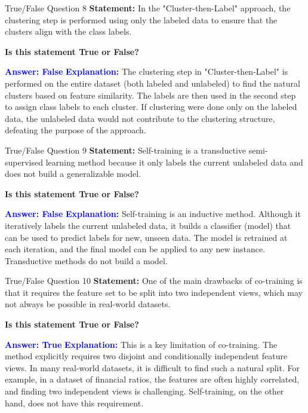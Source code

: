 \documentclass[8pt]{beamer}  %
\begin{document}
	\begin{frame}{True/False Question 8}
		\textbf{Statement:} In the "Cluster-then-Label" approach, the clustering step is performed using only the labeled data to ensure that the clusters align with the class labels.
		
		\vspace{0.3cm}
		\textbf{Is this statement True or False?}
		
		\vspace{0.2cm}
		\textcolor{blue}{\textbf{Answer: False}}
		\vspace{0.2cm}
		\textcolor{blue}{\textbf{Explanation:}} The clustering step in "Cluster-then-Label" is performed on the entire dataset (both labeled and unlabeled) to find the natural clusters based on feature similarity. The labels are then used in the second step to assign class labels to each cluster. If clustering were done only on the labeled data, the unlabeled data would not contribute to the clustering structure, defeating the purpose of the approach.
	\end{frame}
	
	\begin{frame}{True/False Question 9}
		\textbf{Statement:} Self-training is a transductive semi-supervised learning method because it only labels the current unlabeled data and does not build a generalizable model.
		
		\vspace{0.3cm}
		\textbf{Is this statement True or False?}
		
		\vspace{0.2cm}
		\textcolor{blue}{\textbf{Answer: False}}
		\vspace{0.2cm}
		\textcolor{blue}{\textbf{Explanation:}} Self-training is an inductive method. Although it iteratively labels the current unlabeled data, it builds a classifier (model) that can be used to predict labels for new, unseen data. The model is retrained at each iteration, and the final model can be applied to any new instance. Transductive methods do not build a model.
	\end{frame}
	
	\begin{frame}{True/False Question 10}
		\textbf{Statement:} One of the main drawbacks of co-training is that it requires the feature set to be split into two independent views, which may not always be possible in real-world datasets.
		
		\vspace{0.3cm}
		\textbf{Is this statement True or False?}
		
		\vspace{0.2cm}
		\textcolor{blue}{\textbf{Answer: True}}
		\vspace{0.2cm}
		\textcolor{blue}{\textbf{Explanation:}} This is a key limitation of co-training. The method explicitly requires two disjoint and conditionally independent feature views. In many real-world datasets, it is difficult to find such a natural split. For example, in a dataset of financial ratios, the features are often highly correlated, and finding two independent views is challenging. Self-training, on the other hand, does not have this requirement.
	\end{frame}
	
\end{document}
